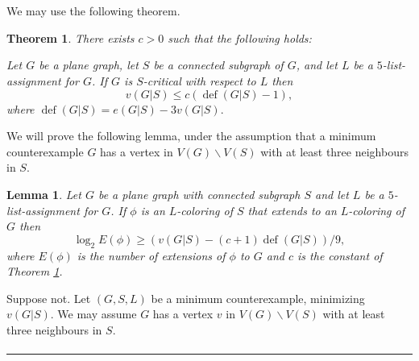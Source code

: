 \documentclass[letterpaper,12pt,oneside,onecolumn]{article}
\newenvironment{proof}{{\bf Proof:  }}{\hfill\rule{2mm}{2mm}}
\newtheorem{lemma}[fact]{Lemma}
\newtheorem{theorem}[fact]{Theorem}
\DeclareMathOperator{\defi}{def}
\begin{document}
\section{}
We may use the following theorem.
\begin{theorem}\label{th:def}
	There exists $c>0$ such that the following holds:
	
	Let $G$ be a plane graph, let $S$ be a connected subgraph of $G$, and let $L$ be a $5$-list-assignment for $G$. If $G$ is $S$-critical with respect to $L$ then
	$$v(G|S) \leq c(\defi(G|S) - 1),$$
	where $\defi(G|S) = e(G|S) - 3v(G|S).$
\end{theorem}
We will prove the following lemma, under the assumption that a minimum counterexample $G$ has a vertex in $V(G)\backslash V(S)$ with at least three neighbours in $S$.
\begin{lemma}
	Let $G$ be a plane graph with connected subgraph $S$ and let $L$ be a $5$-list-assignment for $G$. If $\phi$ is an $L$-coloring of $S$ that extends to an $L$-coloring of $G$ then
	$$\log_2 E(\phi) \geq (v(G|S) - (c+1)\defi(G|S))/9,$$
	where $E(\phi)$ is the number of extensions of $\phi$ to $G$ and $c$ is the constant of Theorem \ref{th:def}.
\end{lemma}
\begin{proof}
	Suppose not. Let $(G,S,L)$ be a minimum counterexample, minimizing $v(G|S)$. We may assume $G$ has a vertex $v$ in $V(G)\backslash V(S)$ with at least three neighbours in $S$.
	\paragraph{}
	 
\end{proof}
\end{document}
